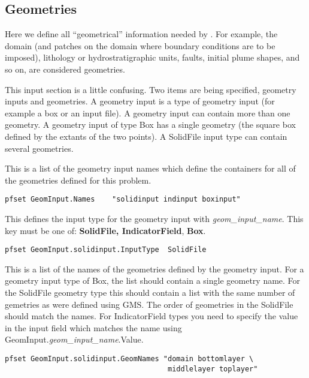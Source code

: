 \subsection{Geometries}
\label{Geometries}

Here we define all ``geometrical'' information needed by \parflow{}.
For example, the domain (and patches on the domain where boundary
conditions are to be imposed), lithology or hydrostratigraphic units,
faults, initial plume shapes, and so on, are considered geometries.

This input section is a little confusing.  Two items are being
specified, geometry inputs and geometries.  A geometry input is a type
of geometry input (for example a box or an input file).  A geometry input
can contain more than one geometry.  A geometry input of type Box
has a single geometry (the square box defined by the extants of the
two points).  A SolidFile input type can contain several geometries.

{
This is a list of the geometry input names which define the containers
for all of the geometries defined for this problem.
}
\begin{display}\begin{verbatim}
pfset GeomInput.Names    "solidinput indinput boxinput"
\end{verbatim}\end{display}

{
This defines the input type for the geometry input with
{\em geom\_input\_name}.  
This key must be one of: {\bf SolidFile, IndicatorField}, {\bf Box}.
}
\begin{display}\begin{verbatim}
pfset GeomInput.solidinput.InputType  SolidFile
\end{verbatim}\end{display}

{
This is a list of the names of the geometries defined by the geometry
input.  For a geometry input type of Box, the list should contain a
single geometry name.  For the SolidFile geometry type this should
contain a list with the same number of gemetries as were defined
using GMS.  The order of geometries in the SolidFile should match the
names.  For IndicatorField types you need to specify the value in the
input field which matches the name using
GeomInput.{\em geom\_input\_name}.Value.
}
\begin{display}\begin{verbatim}
pfset GeomInput.solidinput.GeomNames "domain bottomlayer \
                                      middlelayer toplayer"
\end{verbatim}\end{display}

